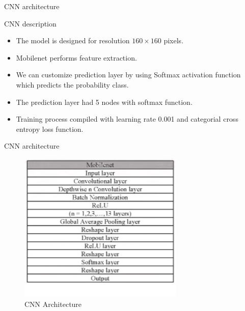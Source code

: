 \documentclass{beamer}
\begin{document}
\begin{frame}{CNN architecture}
    \begin{block}{CNN description}
    \begin{itemize}
        \item The model is designed for resolution $160\times 160$ pixels.
        \item Mobilenet performs feature extraction.
        \item We can customize prediction layer by using Softmax activation function which predicts the probability class.
        \item The prediction layer had 5 nodes with softmax function.
        \item Training process compiled with learning rate 0.001 and categorial cross entropy loss function.
    \end{itemize}
     \end{block}
 \end{frame}
 \begin{frame}{CNN architecture}
     
  \begin{figure}[ht]
    \centering
    \includegraphics[width=0.7\textwidth]{CNN architecture.jpg}
    \caption{CNN Architecture} 
\end{figure}

\end{frame}
\end{document}
